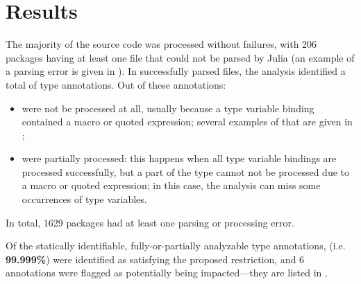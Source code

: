 \section{Results}\label{sec:eval:results}

The majority of the source code was processed without failures,
with 206 packages having at least one file that could not be parsed by Julia (an 
example of a parsing error is given in ).
In successfully parsed files, the analysis identified a total of
 type annotations.
Out of these annotations:
\begin{itemize}
  \item {} were not be processed at all, usually because 
    a type variable binding contained a macro or quoted expression;
    several examples of that are given
    in ;
  \item {} were partially processed: this happens when all 
    type variable bindings are processed successfully, but a part of the type
    cannot not be processed due to a macro or quoted expression; in this case, 
    the analysis can miss some occurrences of type variables.
\end{itemize}
In total, 1629 packages had at least one %
parsing or processing error.

Of the  statically identifiable, 
fully-or-partially analyzable type annotations,
 (i.e. \textbf{99.999\%}) were identified as satisfying
the proposed restriction,
and 6 annotations were flagged as potentially being impacted---they are listed
in .

